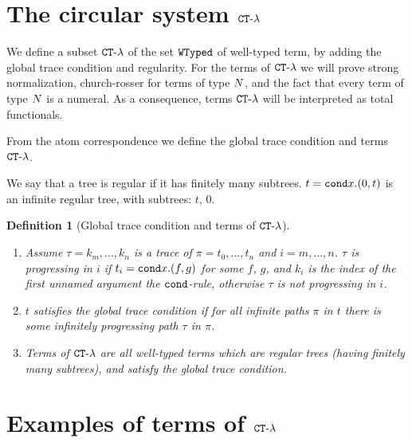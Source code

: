 \documentclass{article}
\newtheorem{definition}[theorem]{Definition}
\begin{document}

\section{The circular system ${ {\tt CT} \mbox{-} \lambda}$}
We define a subset ${ {\tt CT} \mbox{-} \lambda}$ of the set ${\tt WTyped}$ of well-typed term,
by adding the global trace condition and regularity. 
For the terms of ${ {\tt CT} \mbox{-} \lambda}$ we will prove
strong normalization, church-rosser for terms of type ${N}$, and the fact that every term of type
${N}$ is a numeral. 
As a consequence, terms ${ {\tt CT} \mbox{-} \lambda}$ will be interpreted as total functionals. 

From the atom correspondence we define the global trace condition and terms ${ {\tt CT} \mbox{-} \lambda}$.

We say that a tree is regular if it has finitely many subtrees. $t={\tt cond} x.(0,t)$ is an infinite regular tree,
with subtrees: $t$, $0$.

\begin{definition}[Global trace condition and terms of ${ {\tt CT} \mbox{-} \lambda}$]
\begin{enumerate}
\item
Assume $\tau = k_m, \ldots, k_n$ is a trace of $\pi =t_0, \ldots, t_n$ and $i=m,\ldots, n$.
$\tau$ is progressing in $i$ if $t_i={\tt cond} x.(f,g)$ for some $f$, $g$,
and $k_i$ is the index of the first \emph{unnamed} argument the ${\tt cond}$-rule, 
otherwise $\tau$ is not progressing in $i$.

\item
$t$ satisfies the global trace condition if for all infinite paths $\pi$ in $t$ 
there is some infinitely progressing path $\tau$ in $\pi$.

\item
Terms of ${ {\tt CT} \mbox{-} \lambda}$ are all well-typed terms which are regular trees (having finitely many subtrees), 
and satisfy the global trace condition.

\end{enumerate}
\end{definition}


\section{Examples of terms of ${ {\tt CT} \mbox{-} \lambda}$}
\end{document}
